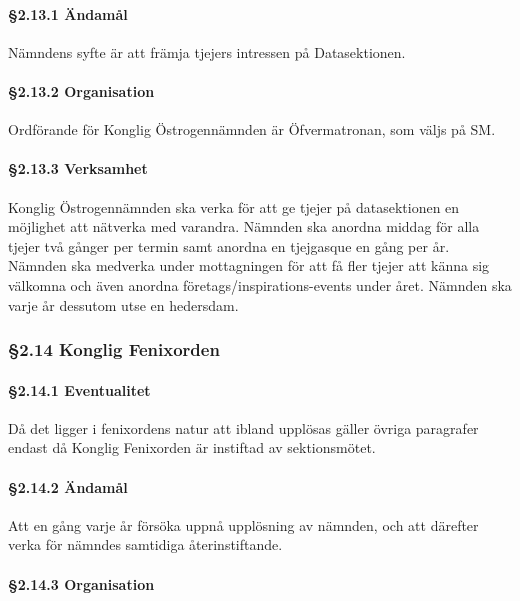 \paragraph{§2.13.1 Ändamål}

Nämndens syfte är att främja tjejers intressen på Datasektionen.

\paragraph{§2.13.2 Organisation}

Ordförande för Konglig Östrogennämnden är Öfvermatronan, som väljs på SM.

\paragraph{§2.13.3 Verksamhet}

Konglig Östrogennämnden ska verka för att ge tjejer på datasektionen en möjlighet att
nätverka med varandra. Nämnden ska anordna middag för alla tjejer två gånger per
termin samt anordna en tjejgasque en gång per år. Nämnden ska medverka under
mottagningen för att få fler tjejer att känna sig välkomna och även anordna
företags/inspirations-events under året. Nämnden ska varje år dessutom utse en
hedersdam.

\subsubsection{§2.14 Konglig Fenixorden}

\paragraph{§2.14.1 Eventualitet}

Då det ligger i fenixordens natur att ibland upplösas gäller övriga paragrafer endast då Konglig Fenixorden är instiftad av sektionsmötet.

\paragraph{§2.14.2 Ändamål}

Att en gång varje år försöka uppnå upplösning av nämnden, och att därefter verka för nämndes samtidiga återinstiftande.

\paragraph{§2.14.3 Organisation}

